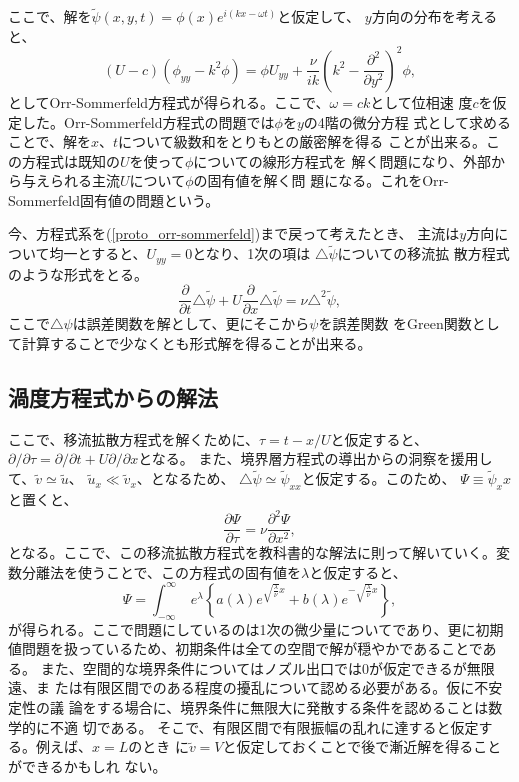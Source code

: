 ここで、解を$\tilde{\psi}(x,y,t)=\phi(x)e^{i(kx-\omega t)}$と仮定して、
$y$方向の分布を考えると、
\begin{equation}
 (U-c)(\phi_{yy}-k^2\phi) = \phi U_{yy}
  + \frac{\nu}{ik}\left(k^2-\frac{\partial^2}{\partial y^2}\right)^2\phi,
\end{equation}
としてOrr-Sommerfeld方程式が得られる。ここで、$\omega = ck$として位相速
度$c$を仮定した。Orr-Sommerfeld方程式の問題では$\phi$を$y$の4階の微分方程
式として求めることで、解を$x$、$t$について級数和をとりもとの厳密解を得る
ことが出来る。この方程式は既知の$U$を使って$\phi$についての線形方程式を
解く問題になり、外部から与えられる主流$U$について$\phi$の固有値を解く問
題になる。これをOrr-Sommerfeld固有値の問題という。

今、方程式系を(\ref{proto_orr-sommerfeld})まで戻って考えたとき、
主流は$y$方向について均一とすると、$U_{yy}=0$となり、1次の項は
$\triangle\tilde{\psi}$についての移流拡
散方程式のような形式をとる。
\begin{equation}
  \frac{\partial}{\partial t}\triangle\tilde{\psi}
  + U\frac{\partial}{\partial x}\triangle\tilde{\psi}
  = \nu\triangle^2\tilde{\psi},
\end{equation}
ここで$\triangle\psi$は誤差関数を解として、更にそこから$\psi$を誤差関数
をGreen関数として計算することで少なくとも形式解を得ることが出来る。

\subsection{渦度方程式からの解法}
ここで、移流拡散方程式を解くために、$\tau = t - x/U$と仮定すると、
$\partial/\partial\tau=\partial/\partial t +U\partial/\partial x$となる。
また、境界層方程式の導出からの洞察を援用して、$\tilde{v}\simeq\tilde{u}$、
$\tilde{u}_x\ll\tilde{v}_x$、となるため、
$\triangle\tilde{\psi}\simeq\tilde{\psi}_{xx}$と仮定する。このため、
$\Psi\equiv\tilde{\psi}_xx$と置くと、
\begin{equation}
 \frac{\partial\Psi}{\partial \tau}=\nu\frac{\partial^2\Psi}{\partial x^2},
\end{equation}
となる。ここで、この移流拡散方程式を教科書的な解法に則って解いていく。変
数分離法を使うことで、この方程式の固有値を$\lambda$と仮定すると、
\begin{equation}
 \Psi = \int_{-\infty}^{\infty}\mspace{5mu}
  e^{\lambda}\left\{a(\lambda)e^{\sqrt{\frac{\lambda}{\nu}}x}+
	     b(\lambda)e^{-\sqrt{\frac{\lambda}{\nu}}x}\right\},
\end{equation}
が得られる。ここで問題にしているのは1次の微少量についてであり、更に初期
値問題を扱っているため、初期条件は全ての空間で解が穏やかであることである。
また、空間的な境界条件についてはノズル出口では0が仮定できるが無限遠、ま
たは有限区間でのある程度の擾乱について認める必要がある。仮に不安定性の議
論をする場合に、境界条件に無限大に発散する条件を認めることは数学的に不適
切である。
そこで、有限区間で有限振幅の乱れに達すると仮定する。例えば、$x=L$のとき
に$\tilde{v}=V$と仮定しておくことで後で漸近解を得ることができるかもしれ
ない。

